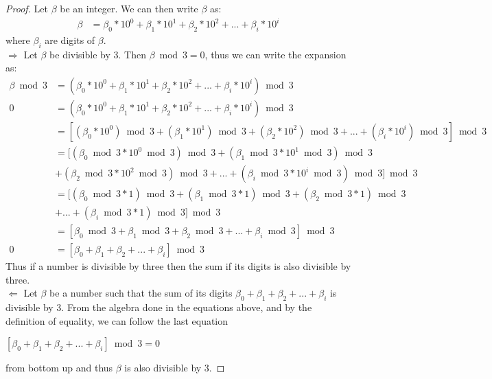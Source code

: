 \documentclass[12pt, fullpage]{article}
\begin{document}
\begin{proof}
 Let $\beta$ be an integer. We can then write $\beta$ as:
\begin{align*}
\beta &= \beta_0*10^0 + \beta_1 * 10^1 + \beta_2 * 10^2 + ... + \beta_i * 10^i
\end{align*}
where $\beta_i$ are digits of $\beta$.\\
$\Rightarrow$ Let $\beta$ be divisible by 3. Then $\beta\bmod 3 = 0$, thus we can write the expansion as: 
\begin{align*}
\beta\bmod 3 &= ( \beta_0*10^0 + \beta_1 * 10^1 + \beta_2 * 10^2 + ... + \beta_i * 10^i ) \bmod 3\\
0 &= ( \beta_0*10^0 + \beta_1 * 10^1 + \beta_2 * 10^2 + ... + \beta_i * 10^i ) \bmod 3  \\
&= [ (\beta_0*10^0) \bmod 3 + (\beta_1 * 10^1) \bmod 3 + (\beta_2 * 10^2) \bmod 3 + ... + (\beta_i * 10^i) \bmod 3 ]\bmod 3 \\
&= [ (\beta_0\bmod 3*10^0\bmod3) \bmod 3 + (\beta_1\bmod 3 * 10^1\bmod 3) \bmod 3 \\& +(\beta_2\bmod 3 * 10^2\bmod 3) \bmod 3 + ... + (\beta_i\bmod 3 * 10^i\bmod 3) \bmod 3 ]\bmod 3 \\
&=[(\beta_0\bmod 3*1) \bmod 3 + (\beta_1\bmod 3 * 1) \bmod 3 +(\beta_2\bmod 3 * 1)\bmod 3 \\& + ... + (\beta_i\bmod 3 * 1) \bmod 3 ]\bmod 3\\
&= [ \beta_0 \bmod 3 + \beta_1\bmod 3+\beta_2\bmod 3 + ... + \beta_i\bmod 3 ]\bmod 3\\
0 &= [ \beta_0+ \beta_1 + \beta_2 + ... + \beta_i ]\bmod 3
\end{align*}
Thus if a number is divisible by three then the sum if its digits is also divisible by three.\\
$\Leftarrow$ Let $\beta$ be a number such that the sum of its digits $\beta_0+ \beta_1 + \beta_2 + ... + \beta_i $ is divisible by 3. From the algebra done in the equations above, and by the definition of equality, we can follow the last equation\\ \begin{center}
$[ \beta_0+ \beta_1 + \beta_2 + ... + \beta_i ]\bmod 3 = 0$
\end{center} from bottom up and thus $\beta$ is also divisible by 3.
\begin{comment} 
\begin{align*}
( \beta_0+ \beta_1 + \beta_2 + ... + \beta_i )\bmod 3 &= 0\\
( (\beta_0) \bmod 3 + (\beta_1)\bmod 3+(\beta_2)\bmod 3 + ... + (\beta_i)\bmod 3 )\bmod 3 &= \\

\end{comment}
\end{proof}
\end{document}
